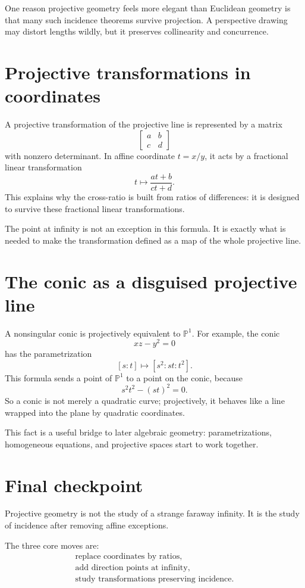 One reason projective geometry feels more elegant than Euclidean geometry is that many such incidence theorems survive projection.  A perspective drawing may distort lengths wildly, but it preserves collinearity and concurrence.

\section{Projective transformations in coordinates}

A projective transformation of the projective line is represented by a matrix
\[
  \begin{bmatrix}a&b\\c&d\end{bmatrix}
\]
with nonzero determinant.  In affine coordinate \(t=x/y\), it acts by a fractional linear transformation
\[
  t\longmapsto \frac{at+b}{ct+d}.
\]
This explains why the cross-ratio is built from ratios of differences: it is designed to survive these fractional linear transformations.

The point at infinity is not an exception in this formula.  It is exactly what is needed to make the transformation defined as a map of the whole projective line.

\section{The conic as a disguised projective line}

A nonsingular conic is projectively equivalent to \(\mathbb P^1\).  For example, the conic
\[
  xz-y^2=0
\]
has the parametrization
\[
  [s:t]\longmapsto [s^2:st:t^2].
\]
This formula sends a point of \(\mathbb P^1\) to a point on the conic, because
\[
  s^2t^2-(st)^2=0.
\]
So a conic is not merely a quadratic curve; projectively, it behaves like a line wrapped into the plane by quadratic coordinates.

This fact is a useful bridge to later algebraic geometry: parametrizations, homogeneous equations, and projective spaces start to work together.

\section{Final checkpoint}

Projective geometry is not the study of a strange faraway infinity. It is the study of incidence after removing affine exceptions.

The three core moves are:
\[
\begin{array}{c}
\text{replace coordinates by ratios},\\
\text{add direction points at infinity},\\
\text{study transformations preserving incidence}.
\end{array}
\]
